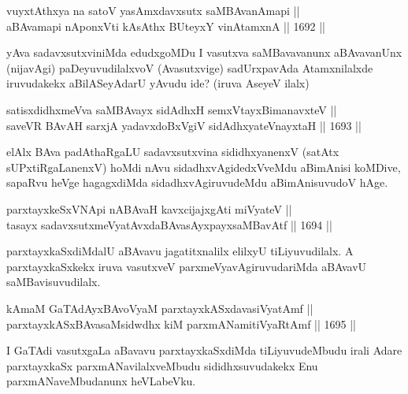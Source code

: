 \begin{shl}
vuyxtAthxya na satoV yasAmxdavxsutx saMBAvanAmapi || \\
aBAvamapi nA\s \s ponxVti kA\s \s sAthx BUteyxY vinA\s \s tamxnA ||  1692 ||  
\end{shl}

\begin{artha}
yAva sadavxsutxviniMda edudxgoMDu I vasutxva saMBavavanunx aBAvavanUnx (nijavAgi) paDeyuvudilalxvoV (Avasutxvige) sadUrxpavAda Atamxnilalxde iruvudakekx aBilASeyAdarU yAvudu ide? (iruva AseyeV ilalx)
\end{artha}


\begin{shl}
satisxdidhxmeVva saMBAvayx sidAdhxH semxVtayxBimanavxteV || \\
saveVR BAvAH sarxjA yadavxdoBxVgiV sidAdhxyateV\s nayxtaH ||  1693 ||  
\end{shl}	

\begin{artha}
elAlx BAva padAthaRgaLU sadavxsutxvina sididhxyanenxV (satAtx sUPxtiRgaLanenxV) hoMdi nAvu sidadhxvAgidedxVveMdu aBimAnisi koMDive, sapaRvu heVge hagagxdiMda sidadhxvAgiruvudeMdu aBimAnisuvudoV hAge.
\end{artha}


\begin{shl}
parxtayxkeSxVNApi nABAvaH kavxcijajxgAti miVyateV || \\
tasayx sadavxsutxmeVyatAvxdaBAvasAyxpayxsaMBavAtf ||  1694 ||  
\end{shl}

\begin{artha}
parxtayxkaSxdiMdalU aBAvavu jagatitxnalilx elilxyU tiLiyuvudilalx. A parxtayxkaSxkekx iruva vasutxveV parxmeVyavAgiruvudariMda aBAvavU saMBavisuvudilalx.
\end{artha}

\begin{shl}
kAmaM GaTAdAyxBAvoV\s yaM parxtayxkASxdavasiVyatAmf || \\
parxtayxkASxBAvasaMsidwdhx kiM parxmANamitiVyaRtAmf ||  1695 ||  
\end{shl}

\begin{artha}
I GaTAdi vasutxgaLa aBavavu parxtayxkaSxdiMda tiLiyuvudeMbudu irali Adare parxtayxkaSx parxmANavilalxveMbudu sididhxsuvudakekx Enu parxmANaveMbudanunx heVLabeVku.
\end{artha}

